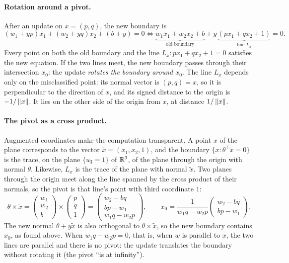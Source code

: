 \begin{notechapter}
\paragraph{Rotation around a pivot.} After an update on $x = (p, q)$, the new boundary is
\[
  (w_1 + yp)x_1 + (w_2 + yq)x_2 + (b + y) = 0
  \iff \underbrace{w_1x_1 + w_2x_2 + b}_{\text{old boundary}} + y\,\underbrace{(px_1 + qx_2 + 1)}_{\text{line }L_x} = 0 .
\]
Every point on both the old boundary and the line $L_x : px_1 + qx_2 + 1 = 0$ satisfies the new
equation. If the two lines meet, the new boundary passes through their intersection
$x_0$: the update \emph{rotates the boundary around $x_0$}. The line $L_x$ depends only on the
misclassified point: its normal vector is $(p, q) = x$, so it is perpendicular to the
direction of $x$, and its signed distance to the origin is $-1/\left\|x\right\|$. It lies on the other side
of the origin from $x$, at distance $1/\left\|x\right\|$.

\paragraph{The pivot as a cross product.} Augmented coordinates make the
computation transparent. A point $x$ of the plane corresponds to the vector $\tilde x = (x_1, x_2, 1)$,
and the boundary $\{x : \theta^\top\tilde x = 0\}$ is the trace, on the plane $\{u_3 = 1\}$ of $\mathbb{R}^3$, of the plane
through the origin with normal $\theta$. Likewise, $L_x$ is the trace of the plane with normal $\tilde x$.
Two planes through the origin meet along the line spanned by the cross product of
their normals, so the pivot is that line's point with third coordinate $1$:
\[
  \theta\times\tilde x =
  \begin{pmatrix}w_1\\w_2\\b\end{pmatrix}\times\begin{pmatrix}p\\q\\1\end{pmatrix}
  = \begin{pmatrix}w_2 - bq\\bp - w_1\\w_1q - w_2p\end{pmatrix},
  \qquad
  x_0 = \frac1{w_1q - w_2p}\begin{pmatrix}w_2 - bq\\bp - w_1\end{pmatrix}.
\]
The new normal $\theta + y\tilde x$ is also orthogonal to $\theta\times\tilde x$, so the new boundary contains
$x_0$, as found above. When $w_1q - w_2p = 0$, that is, when $w$ is parallel to $x$, the two
lines are parallel and there is no pivot: the update translates the boundary
without rotating it (the pivot ``is at infinity'').


\end{notechapter}
